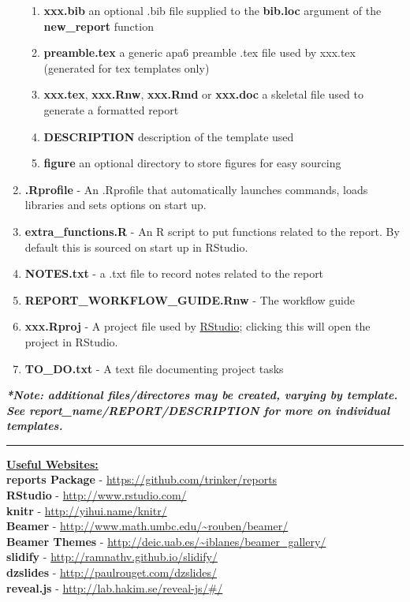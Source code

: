 \documentclass{article}\usepackage{graphicx, color}
\begin{document}
\begin{enumerate}
  \begin{enumerate}
    \item \textbf{xxx.bib} an optional .bib file supplied to the \textbf{bib.loc} argument of the \textbf{new\_report} function
    \item \textbf{preamble.tex} a generic apa6 preamble .tex file used by xxx.tex (generated for tex templates only) 
    \item \textbf{xxx.tex}, \textbf{xxx.Rnw}, \textbf{xxx.Rmd} or \textbf{xxx.doc} a skeletal file used to generate a formatted report
    \item \textbf{DESCRIPTION} description of the template used
    \item \textbf{figure} an optional directory to store figures for easy sourcing
  \end{enumerate} 
  \item \textbf{.Rprofile} - An .Rprofile that automatically launches commands, loads libraries and sets options on start up.
  \item \textbf{extra\_functions.R} - An R script to put functions related to the report.  By default this is sourced on start up in RStudio.  
  \item \textbf{NOTES.txt} - a .txt file to record notes related to the report
  \item \textbf{REPORT\_WORKFLOW\_GUIDE.Rnw} - The workflow guide
  \item \textbf{xxx.Rproj} - A project file used by \href{http://www.rstudio.com/}{RStudio}; clicking this will open the project in RStudio. 
  \item \textbf{TO\_DO.txt} - A text file documenting project tasks
\end{enumerate}
\vspace{1.5 mm}
{\scriptsize \textbf{\emph{*Note: additional files/directores may be created, varying by template. See \texttildelow report\_name/REPORT/DESCRIPTION for more on individual templates.}}}
\vspace{3 mm}
\hrule
\vspace{3 mm}
\noindent \textbf{\underline{Useful Websites:}} \vspace{1.5 mm} \\ 
\textbf{reports Package} - \href{https://github.com/trinker/reports}{https://github.com/trinker/reports}\\ 
\textbf{RStudio} - \href{http://www.rstudio.com/}{http://www.rstudio.com/}\\
\textbf{knitr} - \href{http://yihui.name/knitr/}{http://yihui.name/knitr/}\\
\textbf{Beamer} - \url{http://www.math.umbc.edu/~rouben/beamer/}\\
\textbf{Beamer Themes} - \url{http://deic.uab.es/~iblanes/beamer_gallery/}\\
\textbf{slidify} - \url{http://ramnathv.github.io/slidify/}\\    
\textbf{dzslides} - \url{http://paulrouget.com/dzslides/}\\
\textbf{reveal.js} - \url{http://lab.hakim.se/reveal-js/#/}\\
\end{document}
